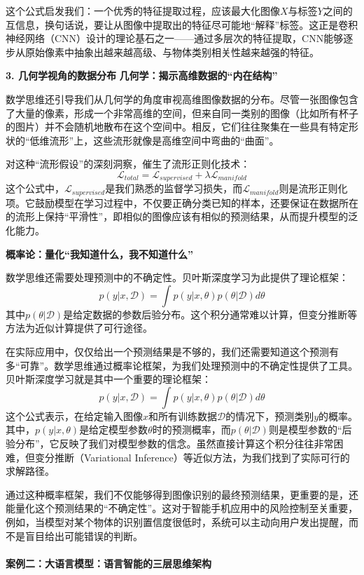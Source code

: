 这个公式启发我们：一个优秀的特征提取过程，应该最大化图像$X$与标签$Y$之间的互信息，换句话说，要让从图像中提取出的特征尽可能地“解释”标签。这正是卷积神经网络（CNN）设计的理论基石之一——通过多层次的特征提取，CNN能够逐步从原始像素中抽象出越来越高级、与物体类别相关性越来越强的特征。

\textbf{3. 几何学视角的数据分布}
\textbf{几何学：揭示高维数据的“内在结构”}

数学思维还引导我们从几何学的角度审视高维图像数据的分布。尽管一张图像包含了大量的像素，形成一个非常高维的空间，但来自同一类别的图像（比如所有杯子的图片）并不会随机地散布在这个空间中。相反，它们往往聚集在一些具有特定形状的“低维流形”上，这些流形就像是高维空间中弯曲的“曲面”。

对这种“流形假设”的深刻洞察，催生了流形正则化技术：
$$\mathcal{L}_{total} = \mathcal{L}_{supervised} + \lambda \mathcal{L}_{manifold}$$
这个公式中，$\mathcal{L}_{supervised}$是我们熟悉的监督学习损失，而$\mathcal{L}_{manifold}$则是流形正则化项。它鼓励模型在学习过程中，不仅要正确分类已知的样本，还要保证在数据所在的流形上保持“平滑性”，即相似的图像应该有相似的预测结果，从而提升模型的泛化能力。

\textbf{概率论：量化“我知道什么，我不知道什么”}

数学思维还需要处理预测中的不确定性。贝叶斯深度学习为此提供了理论框架：
$$p(y|x, \mathcal{D}) = \int p(y|x, \theta) p(\theta|\mathcal{D}) d\theta$$
其中$p(\theta|\mathcal{D})$是给定数据的参数后验分布。这个积分通常难以计算，但变分推断等方法为近似计算提供了可行途径。

在实际应用中，仅仅给出一个预测结果是不够的，我们还需要知道这个预测有多“可靠”。数学思维通过概率论框架，为我们处理预测中的不确定性提供了工具。贝叶斯深度学习就是其中一个重要的理论框架：
$$p(y|x, \mathcal{D}) = \int p(y|x, \theta) p(\theta|\mathcal{D}) d\theta$$
这个公式表示，在给定输入图像$x$和所有训练数据$\mathcal{D}$的情况下，预测类别$y$的概率。其中，$p(y|x, \theta)$是给定模型参数$\theta$时的预测概率，而$p(\theta|\mathcal{D})$则是模型参数的“后验分布”，它反映了我们对模型参数的信念。虽然直接计算这个积分往往非常困难，但变分推断（Variational Inference）等近似方法，为我们找到了实际可行的求解路径。

通过这种概率框架，我们不仅能够得到图像识别的最终预测结果，更重要的是，还能量化这个预测结果的“不确定性”。这对于智能手机应用中的风险控制至关重要，例如，当模型对某个物体的识别置信度很低时，系统可以主动向用户发出提醒，而不是盲目给出可能错误的判断。


\paragraph{案例二：大语言模型：语言智能的三层思维架构}

